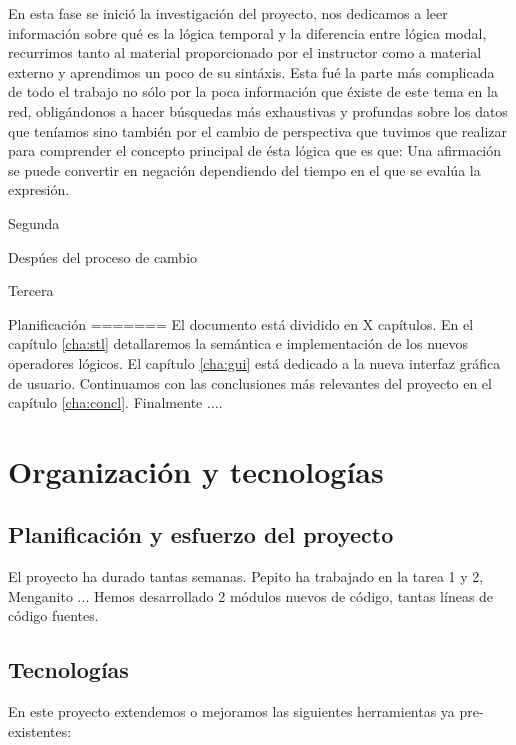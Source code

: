 	En esta fase se inició la investigación del proyecto, nos dedicamos a leer información sobre qué es la lógica temporal y la diferencia entre lógica modal, recurrimos tanto al material proporcionado por el instructor como a material externo y aprendimos un poco de su sintáxis. Esta fué la parte más complicada de todo el trabajo no sólo por la poca información que éxiste de este tema en la red, obligándonos a hacer búsquedas más exhaustivas y profundas sobre los datos que teníamos sino también por el cambio de perspectiva que tuvimos que realizar para comprender el concepto principal de ésta lógica que es que: Una afirmación se puede convertir en negación dependiendo del tiempo en el que se evalúa la expresión. 
	
Segunda

Despúes del proceso de cambio

Tercera

Planificación 
=======
El documento está dividido en X capítulos. En el capítulo \ref{cha:stl} detallaremos la semántica e implementación de los nuevos operadores lógicos. El capítulo \ref{cha:gui} está dedicado a la nueva interfaz gráfica de usuario. Continuamos con las conclusiones más relevantes del proyecto en el capítulo \ref{cha:concl}. Finalmente $\ldots$.

\chapter{Organización y tecnologías}
\section{Planificación y esfuerzo del proyecto}
El proyecto ha durado tantas semanas. Pepito ha trabajado en la tarea 1 y 2, Menganito ...
Hemos desarrollado 2 módulos nuevos de código, tantas líneas de código fuentes.

\section{Tecnologías}
En este proyecto extendemos o mejoramos las siguientes herramientas ya pre-existentes:

